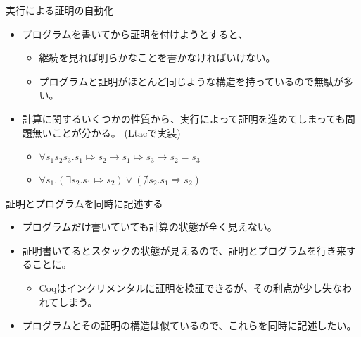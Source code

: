 \documentclass[cjk, 12pt, dvipdfm]{beamer}
\begin{document}
\begin{frame}{実行による証明の自動化}

 \begin{itemize}
  \item プログラムを書いてから証明を付けようとすると、
	\begin{itemize}
	 \item 継続を見れば明らかなことを書かなければいけない。
	 \item プログラムと証明がほとんど同じような構造を持っているので無駄が多い。
	\end{itemize}
  \item 計算に関するいくつかの性質から、実行によって証明を進めてしまっても問題無いことが分かる。
	(Ltacで実装)
	\begin{itemize}
	 \item $\forall s_1 s_2 s_3. s_1 \Mapsto s_2 \to s_1 \Mapsto s_3 \to s_2 = s_3$
	 \item $\forall s_1. (\exists s_2. s_1 \Mapsto s_2) \vee (\nexists s_2. s_1 \Mapsto s_2)$
	\end{itemize}
 \end{itemize}

\end{frame}

\begin{frame}{証明とプログラムを同時に記述する}

 \begin{itemize}
  \item プログラムだけ書いていても計算の状態が全く見えない。
  \item 証明書いてるとスタックの状態が見えるので、証明とプログラムを行き来することに。
	\begin{itemize}
	 \item Coqはインクリメンタルに証明を検証できるが、その利点が少し失なわれてしまう。
	\end{itemize}
  \item プログラムとその証明の構造は似ているので、これらを同時に記述したい。
 \end{itemize}

\end{frame}
\end{document}
